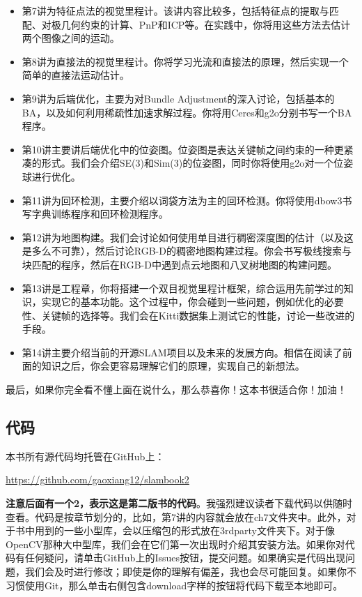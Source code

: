 \begin{enumerate}
\begin{itemize}[leftmargin=1.5em]
	\item 第7讲为特征点法的视觉里程计。该讲内容比较多，包括特征点的提取与匹配、对极几何约束的计算、PnP和ICP等。在实践中，你将用这些方法去估计两个图像之间的运动。
	\item 第8讲为直接法的视觉里程计。你将学习光流和直接法的原理，然后实现一个简单的直接法运动估计。
	\item 第9讲为后端优化，主要为对Bundle Adjustment的深入讨论，包括基本的BA，以及如何利用稀疏性加速求解过程。你将用Ceres和g2o分别书写一个BA程序。
	\item 第10讲主要讲后端优化中的位姿图。位姿图是表达关键帧之间约束的一种更紧凑的形式。我们会介绍SE(3)和Sim(3)的位姿图，同时你将使用g2o对一个位姿球进行优化。
	\item 第11讲为回环检测，主要介绍以词袋方法为主的回环检测。你将使用dbow3书写字典训练程序和回环检测程序。
	\item 第12讲为地图构建。我们会讨论如何使用单目进行稠密深度图的估计（以及这是多么不可靠），然后讨论RGB-D的稠密地图构建过程。你会书写极线搜索与块匹配的程序，然后在RGB-D中遇到点云地图和八叉树地图的构建问题。
	\item 第13讲是工程章，你将搭建一个双目视觉里程计框架，综合运用先前学过的知识，实现它的基本功能。这个过程中，你会碰到一些问题，例如优化的必要性、关键帧的选择等。我们会在Kitti数据集上测试它的性能，讨论一些改进的手段。
	\item 第14讲主要介绍当前的开源SLAM项目以及未来的发展方向。相信在阅读了前面的知识之后，你会更容易理解它们的原理，实现自己的新想法。
\end{itemize}
\end{enumerate}

最后，如果你完全看不懂上面在说什么，那么恭喜你！这本书很适合你！加油！

\subsection{代码}
本书所有源代码均托管在GitHub上：

{\hfill\url{https://github.com/gaoxiang12/slambook2}\hfill}

\textbf{注意后面有一个2，表示这是第二版书的代码}。我强烈建议读者下载代码以供随时查看。代码是按章节划分的，比如，第7讲的内容就会放在ch7文件夹中。此外，对于书中用到的一些小型库，会以压缩包的形式放在3rdparty文件夹下。对于像OpenCV那种大中型库，我们会在它们第一次出现时介绍其安装方法。如果你对代码有任何疑问，请单击GitHub上的Issues按钮，提交问题。如果确实是代码出现问题，我们会及时进行修改；即使是你的理解有偏差，我也会尽可能回复。如果你不习惯使用Git，那么单击右侧包含download字样的按钮将代码下载至本地即可。%


